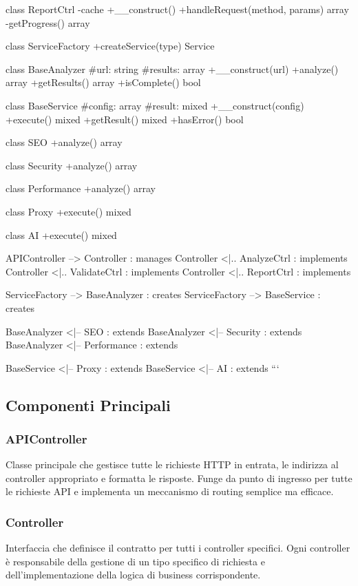     class ReportCtrl {
        -cache
        +__construct()
        +handleRequest(method, params) array
        -getProgress() array
    }
    
    class ServiceFactory {
        +createService(type) Service
    }
    
    class BaseAnalyzer {
        #url: string
        #results: array
        +__construct(url)
        +analyze() array
        +getResults() array
        +isComplete() bool
    }
    
    class BaseService {
        #config: array
        #result: mixed
        +__construct(config)
        +execute() mixed
        +getResult() mixed
        +hasError() bool
    }
    
    class SEO {
        +analyze() array
    }
    
    class Security {
        +analyze() array
    }
    
    class Performance {
        +analyze() array
    }
    
    class Proxy {
        +execute() mixed
    }
    
    class AI {
        +execute() mixed
    }
    
    APIController --> Controller : manages
    Controller <|.. AnalyzeCtrl : implements
    Controller <|.. ValidateCtrl : implements
    Controller <|.. ReportCtrl : implements
    
    ServiceFactory --> BaseAnalyzer : creates
    ServiceFactory --> BaseService : creates
    
    BaseAnalyzer <|-- SEO : extends
    BaseAnalyzer <|-- Security : extends
    BaseAnalyzer <|-- Performance : extends
    
    BaseService <|-- Proxy : extends
    BaseService <|-- AI : extends
```

\subsection{Componenti Principali}

\subsubsection{APIController}
Classe principale che gestisce tutte le richieste HTTP in entrata, le indirizza al controller appropriato e formatta le risposte. Funge da punto di ingresso per tutte le richieste API e implementa un meccanismo di routing semplice ma efficace.

\subsubsection{Controller}
Interfaccia che definisce il contratto per tutti i controller specifici. Ogni controller è responsabile della gestione di un tipo specifico di richiesta e dell'implementazione della logica di business corrispondente.

